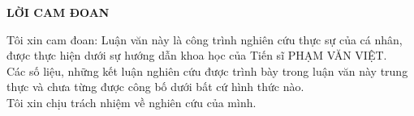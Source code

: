 \newpage
\begin{center}
	\textbf{LỜI CAM ĐOAN}
\end{center}


Tôi xin cam đoan: Luận văn này là công trình nghiên cứu thực sự của cá nhân, được thực hiện dưới sự hướng dẫn khoa học của Tiến sĩ PHẠM VĂN VIỆT. \\

Các số liệu, những kết luận nghiên cứu được trình bày trong luận văn này trung thực và chưa từng được công bố dưới bất cứ hình thức nào.\\

Tôi xin chịu trách nhiệm về nghiên cứu của mình.



